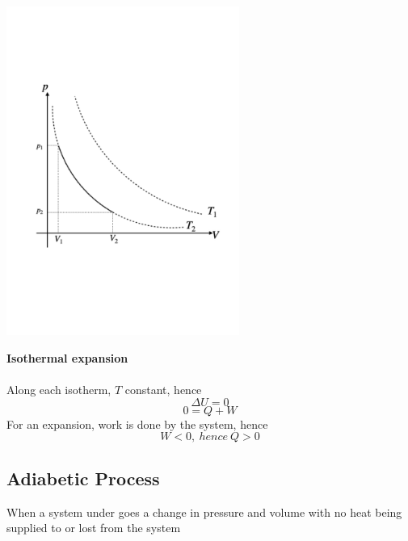 \documentclass[a4paper, 10pt]{article}
\begin{document}
\begin{minipage}{0.5\textwidth}
      \includegraphics[trim = 50 50 50 50, width=3in]{figures/isothermal_process.pdf} 
\end{minipage}	
\begin{minipage}{0.5\textwidth}
   \textbf{Isothermal expansion} \\ \\

   Along each isotherm, $T$ constant, hence
   \[
   \Delta U = 0
   \]
   \[
   0 = Q + W
   \]
   For an expansion, work is done by the system, hence
   \[
   W < 0, \ hence\ Q > 0
   \]
\end{minipage}	

\subsection{Adiabetic Process}
When a system under goes a change in pressure and volume with no heat being supplied to or lost from the system \\
\end{document}
